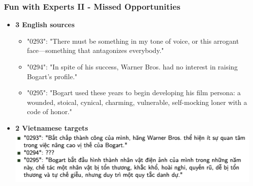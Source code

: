 \documentclass[aspectratio=169]{beamer}
\begin{document}
\begin{frame}[fragile]
	\frametitle{Fun with Experts II - Missed Opportunities}
    \centering
    \begin{itemize}
        \item \textbf{3 English sources}
        \begin{itemize}
            \item "0293": "There must be something in my tone of voice, or this arrogant face—something that antagonizes everybody."
            \item "0294": "In spite of his success, Warner Bros. had no interest in raising Bogart's profile."
            \item "0295": "Bogart used these years to begin developing his film persona: a wounded, stoical, cynical, charming, vulnerable, self-mocking loner with a code of honor."
        \end{itemize}
        \item \textbf{2 Vietnamese targets}
        \includegraphics[width=\textwidth]{images/challenge-vie-1.png}
    \end{itemize}
\end{frame}
\end{document}
